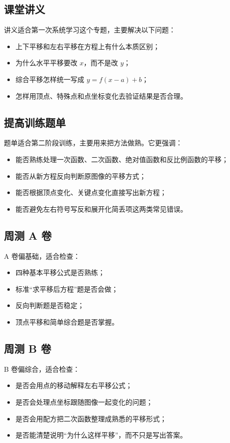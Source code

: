 \documentclass[11pt,a4paper,fontset=fandol]{ctexart}
\begin{document}
\subsection{课堂讲义}
讲义适合第一次系统学习这个专题，主要解决以下问题：
\begin{itemize}
  \item 上下平移和左右平移在方程上有什么本质区别；
  \item 为什么水平平移要改 $x$，而不是改 $y$；
  \item 综合平移怎样统一写成 $y=f(x-a)+b$；
  \item 怎样用顶点、特殊点和点坐标变化去验证结果是否合理。
\end{itemize}

\subsection{提高训练题单}
题单适合第二阶段训练，主要用来把方法做熟。它更强调：
\begin{itemize}
  \item 能否熟练处理一次函数、二次函数、绝对值函数和反比例函数的平移；
  \item 能否从新方程反向判断原图像的平移方式；
  \item 能否根据顶点变化、关键点变化直接写出新方程；
  \item 能否避免左右符号写反和展开化简丢项这两类常见错误。
\end{itemize}

\subsection{周测 A 卷}
A 卷偏基础，适合检查：
\begin{itemize}
  \item 四种基本平移公式是否熟练；
  \item 标准“求平移后方程”题是否会做；
  \item 反向判断题是否稳定；
  \item 顶点平移和简单综合题是否掌握。
\end{itemize}

\subsection{周测 B 卷}
B 卷偏综合，适合检查：
\begin{itemize}
  \item 是否会用点的移动解释左右平移公式；
  \item 是否会处理点坐标跟随图像一起变化的问题；
  \item 是否会用配方把二次函数整理成熟悉的平移形式；
  \item 是否能清楚说明“为什么这样平移”，而不只是写出答案。
\end{itemize}
\end{document}
